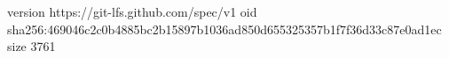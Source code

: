 version https://git-lfs.github.com/spec/v1
oid sha256:469046c2c0b4885bc2b15897b1036ad850d655325357b1f7f36d33c87e0ad1ec
size 3761
